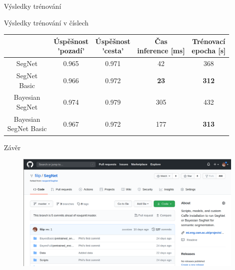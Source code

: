 \documentclass[aspectratio=1610]{beamer}
\begin{document}
\begin{frame}{Výsledky trénování}
\centering
{}
\end{frame}
\begin{frame}{Výsledky trénování v číslech}
\renewcommand{\arraystretch}{1.5}
\begin{table}[h]
	\centering	
	\begin{tabular}{|c|c|c|c|c|}
		\hline
		\thead{Architektura} & \thead{Úspěšnost \\ 'pozadí'} & \thead{Úspěšnost \\ 'cesta'} & \thead{Čas \\ inference [ms] } & \thead{Trénovací \\ epocha [s] }\\		
		\hline	
		SegNet & 0.965 & 0.971 & 42 & 368 \\	
		\hline	
		\makecell{SegNet \\ Basic} & 0.966 & 0.972 & \textbf{23} & \textbf{312} \\	
		\hline	
		\makecell{Bayesian \\ SegNet} & 0.974 & 0.979 & 305 & 432 \\	
		\hline	
		\makecell{Bayesian \\ SegNet Basic} & 0.967 & 0.972 & 177 & \textbf{313} \\
		\hline
	\end{tabular}
\end{table}
\end{frame}
\begin{frame}{Závěr}
\begin{figure}[h]
	\begin{center}
		\includegraphics[width=15cm, keepaspectratio]{github.png}
	\end{center}	 	
\end{figure}
\end{frame}
\end{document}
